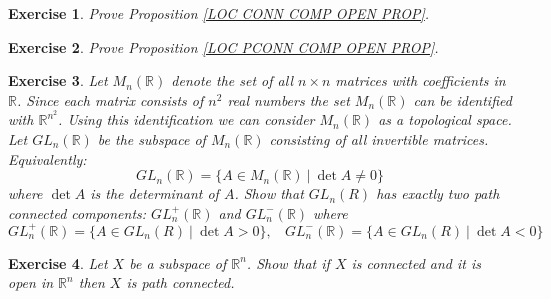 \documentclass[11pt, letterpaper, oneside]{report}
\theoremstyle{pplain}
\newtheorem{ITERMVALUE THM}[theorem]{Intermediate Value Theorem}
\newtheorem{HEINEBOREL THM}[theorem]{Heine-Borel Theorem}
\newtheorem{UMETR THM}[theorem]{Urysohn Metrization Theorem}
\newtheorem{UMETR2 THM}[theorem]{Urysohn Metrization Theorem (v.2)}
\theoremstyle{ddefinition}
\theoremstyle{nnn}
\newtheorem{TDA NN}[theorem]{Topological Data Analysis. }
\theoremstyle{eexercise}
\newtheorem{exercise}{Exercise}[chapter]
\newcommand{\R}{{\mathbb R}}
\begin{document}
\begin{exercise}
Prove Proposition \ref{LOC CONN COMP OPEN PROP}. 
\end{exercise}



\begin{exercise}
Prove Proposition \ref{LOC PCONN COMP OPEN PROP}.
\end{exercise}







\begin{exercise}
Let $M_{n}(\R)$ denote the set of all $n\times n$ matrices with coefficients in $\R$. Since 
each matrix consists of $n^{2}$ real numbers the set $M_{n}(\R)$ can be identified with $\R^{n^{2}}$.
Using this identification we can consider $M_{n}(\R)$ as a topological space. Let $GL_{n}(\R)$ be the 
subspace of $M_{n}(\R)$ consisting of all invertible matrices. Equivalently:
$$GL_{n}(\R) = \{ A\in M_{n}(\R) \ | \ \det A \neq 0\}$$
where $\det A$ is the determinant of $A$. Show that $GL_{n}(R)$ has exactly two path connected components:
$GL_{n}^{+}(\R)$ and $GL_{n}^{-}(\R)$ where 
$$GL_{n}^{+}(\R) = \{ A\in GL_{n}(R) \ | \ \det A > 0\}, \ \ \ \ 
GL_{n}^{-}(\R) = \{ A\in GL_{n}(R) \ | \ \det A < 0\}$$
\end{exercise}







\begin{exercise}
\label{OPEN CONN IN RN IS PATH EXERCISE}
Let $X$ be a subspace of $\R^{n}$. Show that if $X$ is connected and it is open in $\R^{n}$
then $X$ is path connected. 
\end{exercise}
\end{document}
